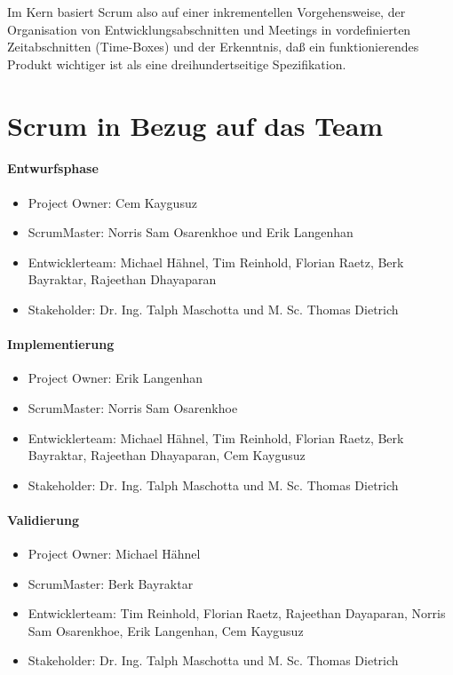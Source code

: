 \documentclass[11pt]{scrreprt}
\begin{document}
Im Kern basiert Scrum also auf einer inkrementellen Vorgehensweise, der Organisation von Entwicklungsabschnitten und Meetings in vordefinierten Zeitabschnitten (Time-Boxes) und der Erkenntnis, daß ein funktionierendes Produkt wichtiger ist als eine dreihundertseitige Spezifikation.

\newpage
\section{Scrum in Bezug auf das Team}
\paragraph{Entwurfsphase}
\begin{itemize}
\item Project Owner: Cem Kaygusuz
\item ScrumMaster: Norris Sam Osarenkhoe und Erik Langenhan
\item Entwicklerteam: Michael Hähnel, Tim Reinhold, Florian Raetz, Berk Bayraktar, Rajeethan Dhayaparan
\item Stakeholder: Dr. Ing. Talph Maschotta und M. Sc. Thomas Dietrich
\end{itemize}
\paragraph{Implementierung}
\begin{itemize}
\item Project Owner: Erik Langenhan
\item ScrumMaster: Norris Sam Osarenkhoe
\item Entwicklerteam: Michael Hähnel, Tim Reinhold, Florian Raetz, Berk Bayraktar, Rajeethan Dhayaparan, Cem Kaygusuz
\item Stakeholder: Dr. Ing. Talph Maschotta und M. Sc. Thomas Dietrich
\end{itemize}
\paragraph{Validierung}
\begin{itemize}
\item Project Owner: Michael Hähnel
\item ScrumMaster: Berk Bayraktar
\item Entwicklerteam: Tim Reinhold, Florian Raetz, Rajeethan Dayaparan, Norris Sam Osarenkhoe, Erik Langenhan, Cem Kaygusuz
\item Stakeholder: Dr. Ing. Talph Maschotta und M. Sc. Thomas Dietrich
\end{itemize}
\end{document}

